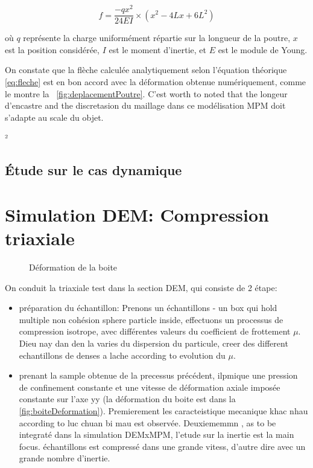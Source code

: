 \documentclass[a4paper,12pt]{report}
\begin{document}
\begin{equation}
    f = \dfrac{-qx^2}{24EI} \times (x^2 - 4Lx + 6L^2)
    \label{eq:fleche}
\end{equation}

où $q$ représente la charge uniformément répartie sur la longueur de la poutre, $x$ est la position considérée, $I$ est le moment d'inertie, et $E$ est le module de Young.

On constate que la flèche calculée analytiquement selon l'équation théorique \eqref{eq:fleche} est en bon accord avec la déformation obtenue numériquement, comme le montre la ~\autoref{fig:deplacementPoutre}.
C'est worth to noted that the longeur d'encastre and the discretasion du maillage dans ce modélisation MPM doit s'adapte au scale du objet.


²\subsection{Étude sur le cas dynamique}



\section{Simulation DEM: Compression triaxiale}

    \begin{figure}[h]
        \centering
        \caption{Déformation de la boite}
        \label{fig:boiteDeformation}
    \end{figure}
On conduit la triaxiale test dans la section DEM, qui consiste de 2 étape: 
\begin{itemize}
\item préparation du échantillon: Prenons un échantillons - un box qui hold multiple non cohésion sphere particle inside, effectuons un processus de compression isotrope, avec différentes valeurs du coefficient de frottement $\mu$. 
Dieu nay dan den la varies du dispersion du particule, creer des different echantillons de denses a lache according to evolution du $\mu$.
\item prenant la sample obtenue de la precessus précédent, ilpmique une pression de confinement constante et une vitesse de déformation axiale imposée constante sur l'axe yy (la déformation du boite est dans la \autoref{fig:boiteDeformation}). 
Premierement les caracteistique mecanique khac nhau according to luc chuan bi mau est observée.
Deuxiememmn , as to be integraté dans la simulation DEMxMPM, l'etude sur la inertie est la main focus. échantillons est compressé dans une grande vitess, d'autre dire avec un grande nombre d'inertie.
\end{itemize}
\end{document}
